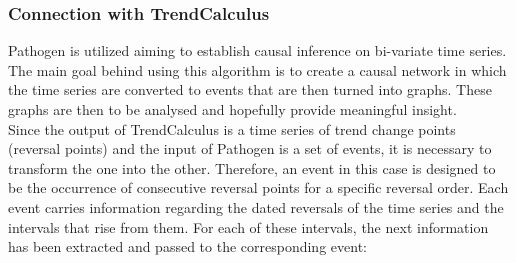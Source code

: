 \documentclass[a4, 11pt]{article}
\begin{document}


\subsubsection{Connection with TrendCalculus}
Pathogen is utilized aiming to establish causal inference on bi-variate time series. The main goal behind using this algorithm is to create a causal network in which the time series are converted to events that are then turned into graphs. These graphs are then to be analysed and hopefully provide meaningful insight. \\[2ex]
Since the output of TrendCalculus is a time series of trend change points (reversal points) and the input of Pathogen is a set of events, it is necessary to transform the one into the other. 
Therefore, an event in this case is designed to be the occurrence of consecutive reversal points for a specific reversal order. Each event carries information regarding the dated reversals of the time series and the intervals that rise from them. 
For each of these intervals, the next information has been extracted and passed to the corresponding event:
\end{document}
